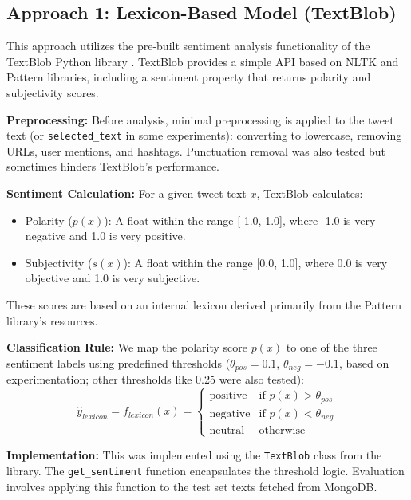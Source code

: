\documentclass[10pt,twocolumn]{article}
\begin{document}
\subsection{Approach 1: Lexicon-Based Model (TextBlob)}
\label{subsec:sol_lexicon}

This approach utilizes the pre-built sentiment analysis functionality of the TextBlob Python library \cite{ref:textblob}. TextBlob provides a simple API based on NLTK and Pattern libraries, including a sentiment property that returns polarity and subjectivity scores.

\textbf{Preprocessing:} Before analysis, minimal preprocessing is applied to the tweet text (or \texttt{selected\_text} in some experiments): converting to lowercase, removing URLs, user mentions, and hashtags. Punctuation removal was also tested but sometimes hinders TextBlob's performance.

\textbf{Sentiment Calculation:} For a given tweet text $x$, TextBlob calculates:
\begin{itemize}[itemsep=0pt, topsep=3pt]
    \item Polarity ($p(x)$): A float within the range [-1.0, 1.0], where -1.0 is very negative and 1.0 is very positive.
    \item Subjectivity ($s(x)$): A float within the range [0.0, 1.0], where 0.0 is very objective and 1.0 is very subjective.
\end{itemize}
These scores are based on an internal lexicon derived primarily from the Pattern library's resources.

\textbf{Classification Rule:} We map the polarity score $p(x)$ to one of the three sentiment labels using predefined thresholds ($\theta_{pos} = 0.1$, $\theta_{neg} = -0.1$, based on experimentation; other thresholds like 0.25 were also tested):
$$ \hat{y}_{lexicon} = f_{lexicon}(x) =
\begin{cases}
    \text{positive} & \text{if } p(x) > \theta_{pos} \\
    \text{negative} & \text{if } p(x) < \theta_{neg} \\
    \text{neutral}  & \text{otherwise}
\end{cases}
$$

\textbf{Implementation:} This was implemented using the \texttt{TextBlob} class from the library. The \texttt{get\_sentiment} function encapsulates the threshold logic. Evaluation involves applying this function to the test set texts fetched from MongoDB.
\end{document}
